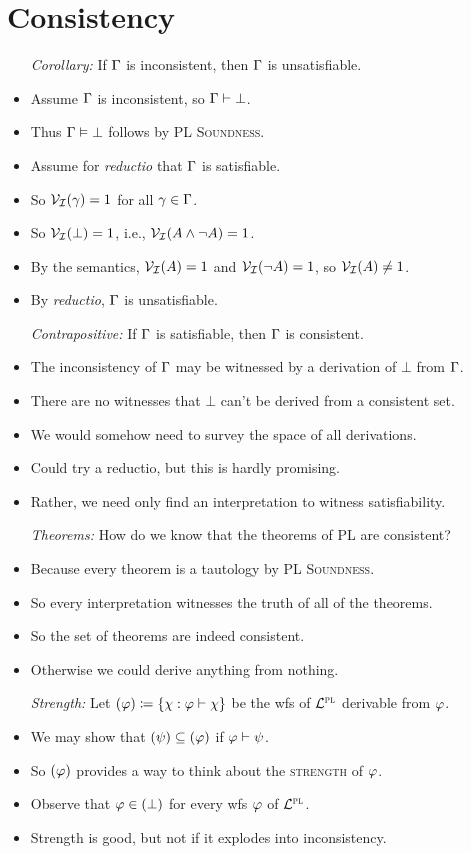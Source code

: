 \documentclass[a4paper, 11pt]{article} %
\begin{document}
\section*{Consistency}
  \label{Consistency}

\begin{itemize}
  \item[\it Corollary:] If $\Gamma$ is inconsistent, then $\Gamma$ is unsatisfiable. 
    \item Assume $\Gamma$ is inconsistent, so $\Gamma \vdash \bot$. 
    \item Thus $\Gamma \vDash \bot$ follows by \textsc{PL Soundness}. 
    \item Assume for \textit{reductio} that $\Gamma$ is satisfiable. 
    \item So $\mathcal{V}_{\mathcal{I}}(\gamma) = 1$ for all $\gamma \in \Gamma$.
    \item So $\mathcal{V}_{\mathcal{I}}(\bot) = 1$, i.e., $\mathcal{V}_{\mathcal{I}}(A \wedge \neg A) = 1$.
    \item By the semantics, $\mathcal{V}_{\mathcal{I}}(A) = 1$ and $\mathcal{V}_{\mathcal{I}}(\neg A) = 1$, so $\mathcal{V}_{\mathcal{I}}(A) \neq 1$.
    \item By \textit{reductio}, $\Gamma$ is unsatisfiable. 
  \item[\it Contrapositive:] If $\Gamma$ is satisfiable, then $\Gamma$ is consistent.
    \item The inconsistency of $\Gamma$ may be witnessed by a derivation of $\bot$ from $\Gamma$.
    \item There are no witnesses that $\bot$ can't be derived from a consistent set.
    \item We would somehow need to survey the space of all derivations.
    \item Could try a reductio, but this is hardly promising.
    \item Rather, we need only find an interpretation to witness satisfiability.
  \item[\it Theorems:] How do we know that the theorems of PL are consistent?
    \item Because every theorem is a tautology by \textsc{PL Soundness}.
    \item So every interpretation witnesses the truth of all of the theorems.
    \item So the set of theorems are indeed consistent.
    \item Otherwise we could derive anything from nothing.
  \item[\it Strength:] Let $(\varphi) \coloneq \lbrace\chi : \varphi \vdash \chi\rbrace$ be the wfs of $\mathcal{L}^{\textsc{pl}}$ derivable from $\varphi$.
    \item We may show that $(\psi) \subseteq (\varphi)$ if $\varphi \vdash \psi$. 
    \item So $(\varphi)$ provides a way to think about the \textsc{strength} of $\varphi$.
    \item Observe that $\varphi \in (\bot)$ for every wfs $\varphi$ of $\mathcal{L}^{\textsc{pl}}$.
    \item Strength is good, but not if it explodes into inconsistency.
\end{itemize}
\end{document}
